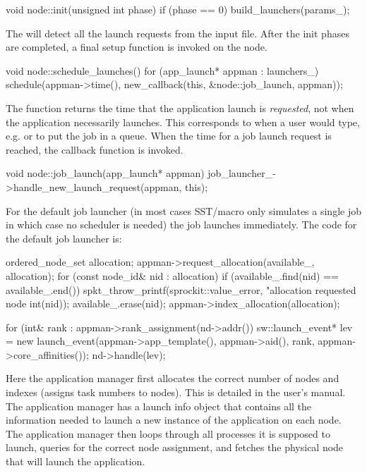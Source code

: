 \begin{CppCode}
void
node::init(unsigned int phase)
{
  if (phase == 0){
    build_launchers(params_);
  }
}
\end{CppCode}
The  will detect all the launch requests from the input file.  After the init phases are completed, a final setup function is invoked on the node.

\begin{CppCode}
void
node::schedule_launches()
{
  for (app_launch* appman : launchers_){
    schedule(appman->time(), new_callback(this, &node::job_launch, appman));
  }
}
\end{CppCode}
The function  returns the time that the application launch is \emph{requested}, not when the application  necessarily launches.
This corresponds to when a user would type, e.g.  or  to put the job in a queue.
When the time for a job launch request is reached, the callback function is invoked.

\begin{CppCode}
void
node::job_launch(app_launch* appman)
{
  job_launcher_->handle_new_launch_request(appman, this);
}
\end{CppCode}
For the default job launcher (in most cases SST/macro only simulates a single job in which case no scheduler is needed) the job launches immediately. 
The code for the default job launcher is:

\begin{CppCode}
ordered_node_set allocation;
appman->request_allocation(available_, allocation);
for (const node_id& nid : allocation){
  if (available_.find(nid) == available_.end()){
    spkt_throw_printf(sprockit::value_error,
                      "allocation requested node %
                      int(nid));
  }
  available_.erase(nid);
}
appman->index_allocation(allocation);

for (int& rank : appman->rank_assignment(nd->addr()){
  sw::launch_event* lev = new launch_event(appman->app_template(), appman->aid(),
                                             rank, appman->core_affinities());
  nd->handle(lev);
}
\end{CppCode}
Here the application manager first allocates the correct number of nodes and indexes (assigns task numbers to nodes).
This is detailed in the user's manual.
The application manager has a launch info object that contains all the information needed to launch a new instance of the application on each node.
The application manager then loops through all processes it is supposed to launch,
queries for the correct node assignment,
and fetches the physical node that will launch the application.

